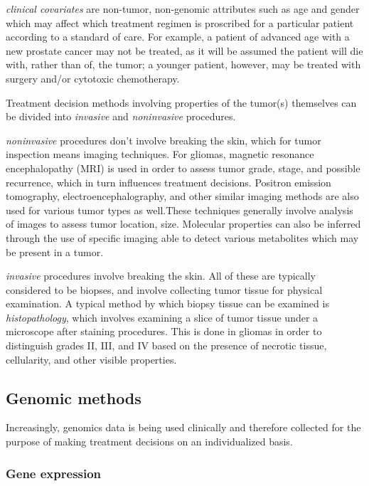       \textit{clinical covariates} are non-tumor, non-genomic attributes such as age and gender
      which may affect which treatment regimen is proscribed for a
      particular patient according to a standard of care. For example,
      a patient of advanced age with a new prostate cancer may not be
      treated, as it will be assumed the patient will die with, rather
      than of, the tumor; a younger patient, however, may be treated
      with surgery and/or cytotoxic chemotherapy.

      Treatment decision methods involving properties of the tumor(s)
      themselves can be divided into \textit{invasive} and
      \textit{noninvasive} procedures.

      \textit{noninvasive} procedures don't involve breaking the skin,
      which for tumor inspection means imaging techniques. For
      gliomas, magnetic resonance encephalopathy (MRI) is used in
      order to assess tumor grade, stage, and possible recurrence, which in turn influences
      treatment decisions. Positron emission tomography,
      electroencephalography, and other similar imaging methods are
      also used for various tumor types as well.These techniques
      generally involve analysis of images to assess tumor location,
      size. Molecular properties can also be inferred through the use
      of specific imaging able to detect various metabolites which may
      be present in a tumor. 

      \textit{invasive} procedures involve breaking the skin. All of
      these are typically considered to be biopses, and involve
      collecting tumor tissue for physical examination. A typical
      method by which biopsy tissue can be examined is
      \textit{histopathology}, which
      involves examining a slice of tumor tissue under a microscope
      after staining procedures. This is done in gliomas in order to
      distinguish grades II, III, and IV based on the presence of necrotic
      tissue, cellularity, and other visible properties.

      \subsection{Genomic methods}

      Increasingly, genomics data is being used clinically and
      therefore collected for the purpose of making treatment
      decisions on an individualized basis.

      \subsubsection{Gene expression}

